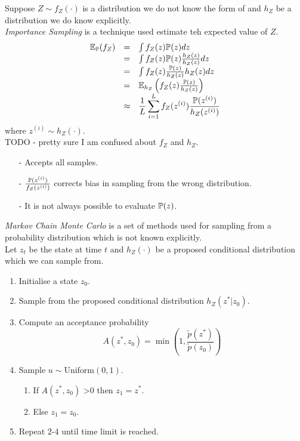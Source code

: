 \documentclass[11pt,a4paper]{article}
\begin{document}
Suppose $Z\sim f_Z(\cdot)$ is a distribution we do not know the form of and $h_Z$ be a distribution we do know explicitly.\\
\textit{Importance Sampling} is a technique used estimate teh expected value of $Z$.
\[\begin{array}{rcl}
\mathbb{E}_{\mathbb{P}}(f_Z)&=&\int f_Z(z)\mathbb{P}(z)dz\\
&=&\int f_Z(z)\mathbb{P}(z)\frac{h_Z(z)}{h_Z(z)}dz\\
&=&\int f_Z(z)\frac{\mathbb{P}(z)}{h_Z(z)}h_Z(z)dz\\
&=&\mathbb{E}_{h_Z}\left(f_Z(z)\frac{\mathbb{P}(z)}{h_Z(z)}\right)\\
&\approx&{\displaystyle\frac{1}{L}\sum_{i=1}^Lf_Z(z^{(i)})\frac{\mathbb{P}(z^{(i)})}{h_Z(z^{(i)})}}\\
\end{array}\]
where $z^{(i)}\sim h_Z(\cdot)$.\\
TODO - pretty sure I am confused about $f_Z$ and $h_Z$.\\

\begin{itemize}
	\item[-] Accepts all samples.
	\item[-] $\frac{\mathbb{P}(z^{(i)})}{f_Z(z^{(i)})}$ corrects bias in sampling from the wrong distribution.
	\item[-] It is not always possible to evaluate $\mathbb{P}(z)$.
\end{itemize}

\textit{Markov Chain Monte Carlo} is a set of methods used for sampling from a probability distribution which is not known explicitly.\\
Let $z_t$ be the state at time $t$ and $h_Z(\cdot)$ be a proposed conditional distribution which we can sample from.
\begin{enumerate}
	\item Initialise a state $z_0$.
	\item Sample from the proposed conditional distribution $h_Z(z^*|z_0)$.
	\item Compute an acceptance probability
	$$A(z^*,z_0)=\min\left(1,\frac{\tilde{p}(z^*)}{\tilde{p}(z_0)}\right)$$
	\item Sample $u\sim\text{Uniform}(0,1)$.
	\begin{enumerate}
		\item If $A(z^*,z_0)$ >0 then $z_1=z^*$.
		\item Else $z_1=z_0$.
	\end{enumerate}
	\item Repeat 2-4 until time limit is reached.
\end{enumerate}
\end{document}
